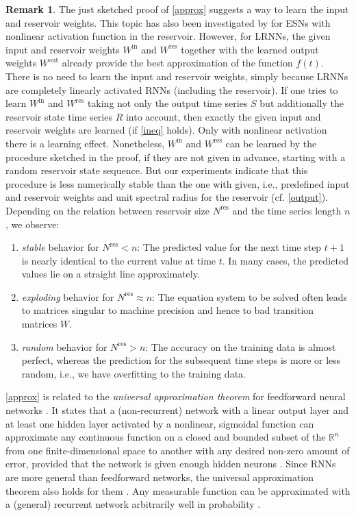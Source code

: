 \documentclass[twoside,11pt]{article}
\theoremstyle{definition}
\newtheorem{remk}{Remark}
\begin{document}
\begin{remk}
The just sketched proof of \cref{approx} suggests a way to learn the input
and reservoir weights. This topic has also been investigated by \citet{PDW13} for
ESNs with nonlinear activation function in the reservoir. However, for LRNNs, the
given input and reservoir weights $W^\mathrm{in}$ and $W^\mathrm{res}$ together
with the learned output weights $W^\mathrm{out}$ already provide the best
approximation of the function $f(t)$. There is no need to learn the input and
reservoir weights, simply because LRNNs are
completely linearly activated RNNs (including the reservoir). If one tries to
learn $W^\mathrm{in}$ and $W^\mathrm{res}$ taking not only the output time
series $S$ but additionally the reservoir state time series $R$ into account,
then exactly the given input and reservoir weights are learned (if \cref{ineq}
holds). Only with nonlinear activation there is a learning effect. Nonetheless,
$W^\mathrm{in}$ and $W^\mathrm{res}$ can be learned by the procedure sketched in
the proof, if they are not given in advance, starting with a random
reservoir state sequence. But our experiments indicate that this procedure is
less numerically stable than the one with given, i.e., predefined input and
reservoir weights and unit spectral radius for the reservoir (cf.
\cref{output}). Depending on the relation between reservoir size
$N^\mathrm{res}$ and the time series length $n$, we observe:
\begin{enumerate}
  \item \emph{stable} behavior for $N^\mathrm{res} < n$: The predicted value for
	the next time step $t+1$ is nearly identical to the current value at
	time $t$. In many cases, the predicted values lie on a straight line
	approximately.
  \item \emph{exploding} behavior for $N^\mathrm{res} \approx n$: The equation
	system to be solved often leads to matrices singular to machine
	precision and hence to bad transition matrices $W$.
  \item \emph{random} behavior for $N^\mathrm{res} > n$: The accuracy on the
	training data is almost perfect, whereas the prediction for the
	subsequent time steps is more or less random, i.e., we have overfitting
	to the training data.
\end{enumerate}
\end{remk}

\cref{approx} is related to the \emph{universal approximation theorem} for
feedforward neural networks \citep{Hor91}. It states that a (non-recurrent)
network with a linear output layer and at least one hidden layer activated by a
nonlinear, sigmoidal function can approximate any continuous function on a
closed and bounded subset of the $\mathbb{R}^n$ from one finite-dimensional
space to another with any desired non-zero amount of error, provided that the
network is given enough hidden neurons \citep[Sect.~6.4.1]{GBC16}. Since RNNs
are more general than feedforward networks, the universal approximation theorem
also holds for them \citep{MNM02}. Any measurable function can be
approximated with a (general) recurrent network arbitrarily well in probability
\citep{Ham00}.
\end{document}
